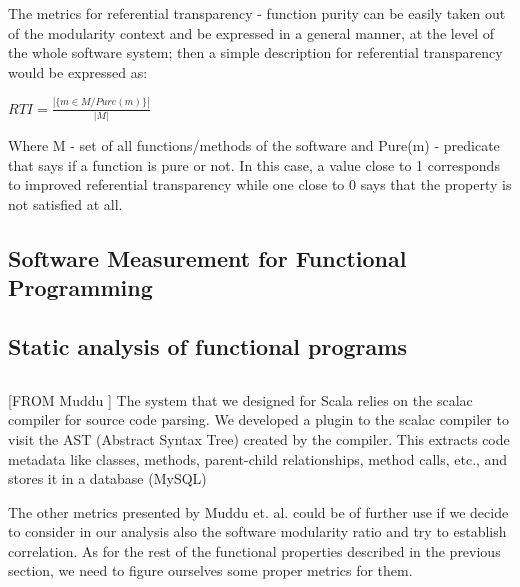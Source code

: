 \documentclass{article}
\begin{document}
The metrics for referential transparency - function purity can be easily taken out of the modularity context and be expressed in a general manner, at the level of the whole software system; then a simple description for referential transparency would be expressed as:  \par
\begin{center}
\begin{math}
  RTI = \frac{ | \{ m \in M / Pure(m) \} | } { | M | }
\end{math}
\end{center}

Where  M - set of all functions/methods of the software and  Pure(m) - predicate that says if a function is pure or not. In this case, a value close to 1 corresponds to improved referential transparency while one close to 0 says that the property is not satisfied at all. \par


\subsection{Software Measurement for Functional Programming } 
\cite{Ryder04softwaremeasurement}

\subsection{Static analysis of functional programs}
\cite{DBLP:journals/infsof/BergB95}

\subsection{}

[FROM Muddu ] The system that we designed for Scala relies on the scalac compiler for source code parsing. We developed a plugin to the scalac compiler to visit the AST (Abstract Syntax Tree) created by the compiler. This extracts code metadata like classes, methods, parent-child relationships, method calls, etc., and stores it in a database (MySQL)

The other metrics presented by Muddu et. al. could be of further use if we decide to consider in our analysis also the software modularity ratio and try to establish correlation. As for the rest of the functional properties described in the previous section, we need to figure ourselves some proper metrics for them.
\end{document}
